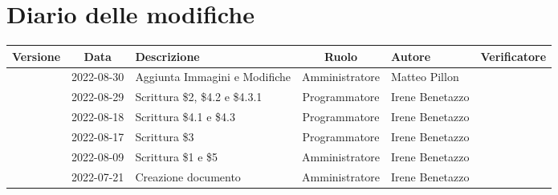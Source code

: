 \section*{Diario delle modifiche}
	\begin{center}
	\renewcommand{\arraystretch}{1.8} %
	\begin{longtable}{ |c|c|p{8em}|c|m{5em}|m{6em}| }
	\hline
	\textbf{Versione} & \textbf{Data} & \textbf{Descrizione} &  \textbf{Ruolo} &  \textbf{Autore} & \textbf{Verificatore}\\ %
	\hline %
	& 2022-08-30 & Aggiunta Immagini e Modifiche & Amministratore & Matteo \newline Pillon & \\ 
	\hline
	& 2022-08-29 & Scrittura \$2, \$4.2 e \$4.3.1 & Programmatore & Irene \newline Benetazzo & \\ 
	\hline
	& 2022-08-18 & Scrittura \$4.1 e \$4.3 & Programmatore & Irene \newline Benetazzo & \\ 
	\hline
	& 2022-08-17 & Scrittura \$3 & Programmatore & Irene \newline Benetazzo & \\ 
	\hline
	& 2022-08-09 & Scrittura \$1 e \$5 & Amministratore & Irene \newline Benetazzo & \\ 
	\hline
    & 2022-07-21 & Creazione documento & Amministratore & Irene \newline Benetazzo & \\ 
	\hline
	\end{longtable}
	\end{center}
	\newpage